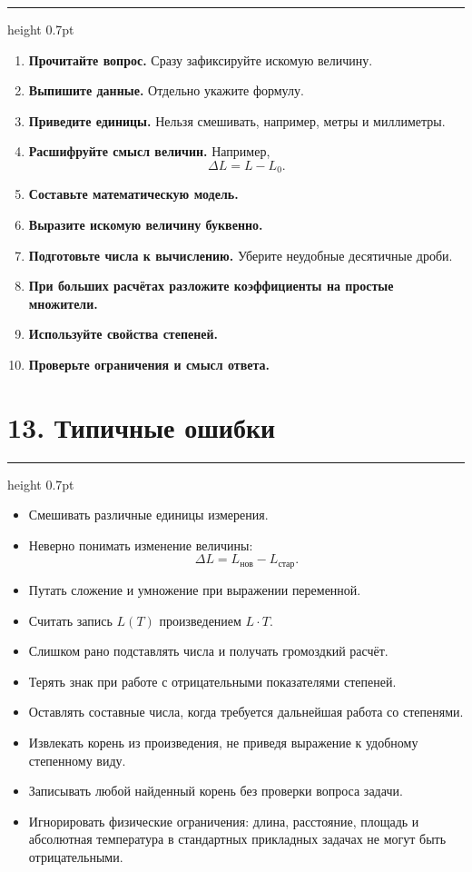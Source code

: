 \documentclass[a4paper,12pt]{article}
\newcommand{\sectionline}{%
    \par\vspace{0.15em}
    {\color{lightaccent}\hrule height 0.7pt}
    \vspace{0.7em}
}
\newcommand{\key}[1]{\textcolor{darkaccent}{\textbf{#1}}}
\begin{document}
\sectionline

\begin{enumerate}
    \item \key{Прочитайте вопрос.} Сразу зафиксируйте искомую величину.
    \item \key{Выпишите данные.} Отдельно укажите формулу.
    \item \key{Приведите единицы.} Нельзя смешивать, например, метры и миллиметры.
    \item \key{Расшифруйте смысл величин.} Например,
    \[
    \Delta L=L-L_0.
    \]
    \item \key{Составьте математическую модель.}
    \item \key{Выразите искомую величину буквенно.}
    \item \key{Подготовьте числа к вычислению.} Уберите неудобные десятичные дроби.
    \item \key{При больших расчётах разложите коэффициенты на простые множители.}
    \item \key{Используйте свойства степеней.}
    \item \key{Проверьте ограничения и смысл ответа.}
\end{enumerate}

\section*{\textcolor{darkaccent}{13. Типичные ошибки}}

\sectionline

\begin{itemize}
    \item Смешивать различные единицы измерения.
    \item Неверно понимать изменение величины:
    \[
    \Delta L=L_{\text{нов}}-L_{\text{стар}}.
    \]
    \item Путать сложение и умножение при выражении переменной.
    \item Считать запись \(L(T)\) произведением \(L\cdot T\).
    \item Слишком рано подставлять числа и получать громоздкий расчёт.
    \item Терять знак при работе с отрицательными показателями степеней.
    \item Оставлять составные числа, когда требуется дальнейшая работа со степенями.
    \item Извлекать корень из произведения, не приведя выражение к удобному степенному виду.
    \item Записывать любой найденный корень без проверки вопроса задачи.
    \item Игнорировать физические ограничения: длина, расстояние, площадь и абсолютная температура
    в стандартных прикладных задачах не могут быть отрицательными.
\end{itemize}
\end{document}
